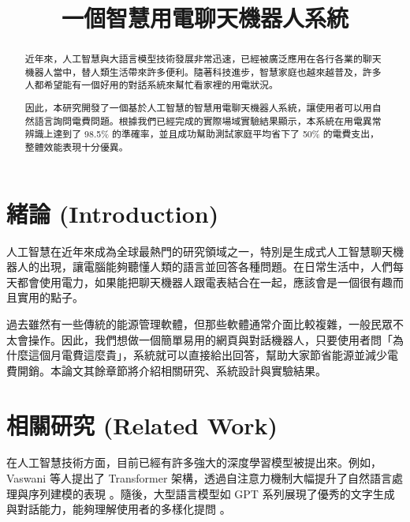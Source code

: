 \documentclass[conference]{IEEEtran}
\begin{document}
\title{一個智慧用電聊天機器人系統}

\author{
}

\maketitle

\begin{abstract}
近年來，人工智慧與大語言模型技術發展非常迅速，已經被廣泛應用在各行各業的聊天機器人當中，替人類生活帶來許多便利。隨著科技進步，智慧家庭也越來越普及，許多人都希望能有一個好用的對話系統來幫忙看家裡的用電狀況。

因此，本研究開發了一個基於人工智慧的智慧用電聊天機器人系統，讓使用者可以用自然語言詢問電費問題。根據我們已經完成的實際場域實驗結果顯示，本系統在用電異常辨識上達到了 98.5\% 的準確率，並且成功幫助測試家庭平均省下了 50\% 的電費支出，整體效能表現十分優異。
\end{abstract}


\section{緒論 (Introduction)}
人工智慧在近年來成為全球最熱門的研究領域之一，特別是生成式人工智慧聊天機器人的出現，讓電腦能夠聽懂人類的語言並回答各種問題。在日常生活中，人們每天都會使用電力，如果能把聊天機器人跟電表結合在一起，應該會是一個很有趣而且實用的點子。

過去雖然有一些傳統的能源管理軟體，但那些軟體通常介面比較複雜，一般民眾不太會操作。因此，我們想做一個簡單易用的網頁與對話機器人，只要使用者問「為什麼這個月電費這麼貴」，系統就可以直接給出回答，幫助大家節省能源並減少電費開銷。本論文其餘章節將介紹相關研究、系統設計與實驗結果。

\section{相關研究 (Related Work)}
在人工智慧技術方面，目前已經有許多強大的深度學習模型被提出來。例如，Vaswani 等人提出了 Transformer 架構，透過自注意力機制大幅提升了自然語言處理與序列建模的表現 \cite{vaswani2017}。隨後，大型語言模型如 GPT 系列展現了優秀的文字生成與對話能力，能夠理解使用者的多樣化提問 \cite{brown2020}。
\end{document}
